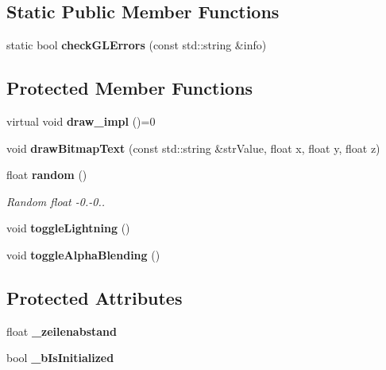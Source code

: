 \subsection*{Static Public Member Functions}
\begin{DoxyCompactItemize}
\item 
static bool {\bfseries check\-G\-L\-Errors} (const std\-::string \&info)\label{classSoundfieldViewer_1_1RenderObjectBase_a386332e7df1988a5b41e6eb17d34dc18}

\end{DoxyCompactItemize}
\subsection*{Protected Member Functions}
\begin{DoxyCompactItemize}
\item 
virtual void {\bfseries draw\-\_\-impl} ()=0\label{classSoundfieldViewer_1_1RenderObjectBase_a4f0c2bdb7a0bfbd0ae98c35557f0945a}

\item 
void {\bfseries draw\-Bitmap\-Text} (const std\-::string \&str\-Value, float x, float y, float z)\label{classSoundfieldViewer_1_1RenderObjectBase_a4fcd03f910648a088f66b3c9bf0fdd54}

\item 
float {\bf random} ()
\begin{DoxyCompactList}\small\item\em Random float -\/0.-\/0.. \end{DoxyCompactList}\item 
void {\bfseries toggle\-Lightning} ()\label{classSoundfieldViewer_1_1RenderObjectBase_aaea43ddcc450b98e82d44ee89200e579}

\item 
void {\bfseries toggle\-Alpha\-Blending} ()\label{classSoundfieldViewer_1_1RenderObjectBase_ab25d924e55e6a4a01a7b9b01719d7271}

\end{DoxyCompactItemize}
\subsection*{Protected Attributes}
\begin{DoxyCompactItemize}
\item 
float {\bfseries \-\_\-zeilenabstand}\label{classSoundfieldViewer_1_1RenderObjectBase_ae042add858cfd92ae306db782a168a65}

\item 
bool {\bfseries \-\_\-b\-Is\-Initialized}\label{classSoundfieldViewer_1_1RenderObjectBase_a0107ff6fdd52a9a9f56c485637bd3b02}

\end{DoxyCompactItemize}
